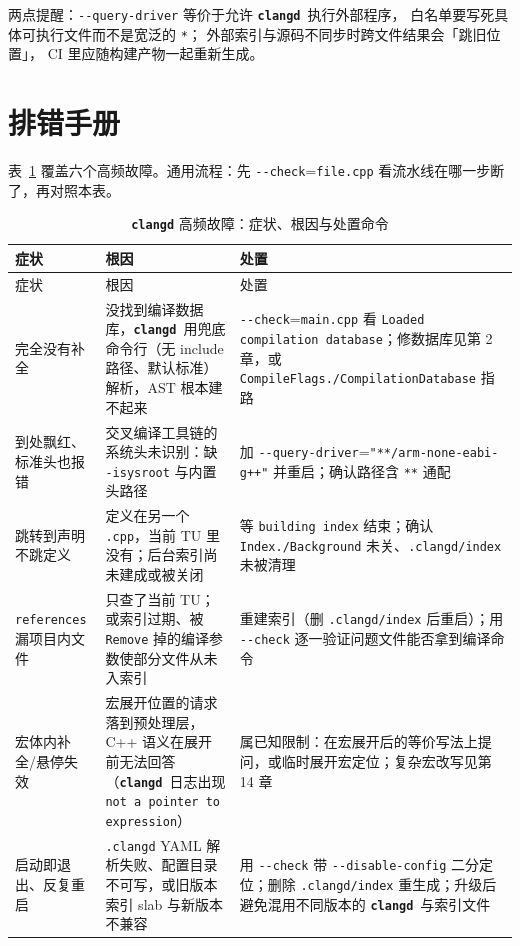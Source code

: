 \documentclass[12pt,a4paper,fontset=fandol]{ctexbook}
\newcommand{\Opt}[1]{\texttt{-\/-#1}}
\newcommand{\Lib}[1]{\textbf{\texttt{#1}}}
\newcommand{\Lang}[1]{\textsf{#1}}
\newcommand{\CPP}{\Lang{C++}}
\newcommand{\CD}{\Lib{clangd}}
\begin{document}
两点提醒：\Opt{query-driver} 等价于允许 \CD\ 执行外部程序，
白名单要写死具体可执行文件而不是宽泛的 \texttt{*}；
外部索引与源码不同步时跨文件结果会「跳旧位置」，
CI 里应随构建产物一起重新生成。

\section{排错手册}\label{sec:ch05-s6}

表~\ref{tab:ch05-debug} 覆盖六个高频故障。通用流程：先
\Opt{check}=\texttt{file.cpp} 看流水线在哪一步断了，再对照本表。

\begin{longtable}{>{\raggedright\arraybackslash}p{}
                  >{\raggedright\arraybackslash}p{}
                  >{\raggedright\arraybackslash}p{}}
\caption{\CD{} 高频故障：症状、根因与处置命令}\label{tab:ch05-debug}\\
\toprule
症状 & 根因 & 处置 \\
\midrule
\endfirsthead
\toprule
症状 & 根因 & 处置 \\
\midrule
\endhead
完全没有补全 & 没找到编译数据库，\CD\ 用兜底命令行（无 include 路径、默认标准）解析，AST 根本建不起来 & \Opt{check}=\texttt{main.cpp} 看 \texttt{Loaded compilation database}；修数据库见第 2 章，或 \texttt{CompileFlags./}\hspace{0pt}\texttt{Compilation}\hspace{0pt}\texttt{Database} 指路 \\
\midrule
到处飘红、标准头也报错 & 交叉编译工具链的系统头未识别：缺 \texttt{-isysroot} 与内置头路径 & 加 \Opt{query-driver}=\hspace{0pt}\texttt{"**/}\hspace{0pt}\texttt{arm-none-eabi-g++"} 并重启；确认路径含 \texttt{**} 通配 \\
\midrule
跳转到声明不跳定义 & 定义在另一个 \texttt{.cpp}，当前 TU 里没有；后台索引尚未建成或被关闭 & 等 \texttt{building index} 结束；确认 \texttt{Index./}\hspace{0pt}\texttt{Background} 未关、\texttt{.clangd/index} 未被清理 \\
\midrule
\texttt{references} 漏项目内文件 & 只查了当前 TU；或索引过期、被 \texttt{Remove} 掉的编译参数使部分文件从未入索引 & 重建索引（删 \texttt{.clangd/index} 后重启）；用 \Opt{check} 逐一验证问题文件能否拿到编译命令 \\
\midrule
宏体内补全/悬停失效 & 宏展开位置的请求落到预处理层，\CPP{} 语义在展开前无法回答（\CD\ 日志出现 \texttt{not a pointer to expression}） & 属已知限制：在宏展开后的等价写法上提问，或临时展开宏定位；复杂宏改写见第 14 章 \\
\midrule
启动即退出、反复重启 & \texttt{.clangd} YAML 解析失败、配置目录不可写，或旧版本索引 slab 与新版本不兼容 & 用 \Opt{check} 带 \Opt{disable-config} 二分定位；删除 \texttt{.clangd/index} 重生成；升级后避免混用不同版本的 \CD\ 与索引文件 \\
\bottomrule
\end{longtable}
\end{document}
